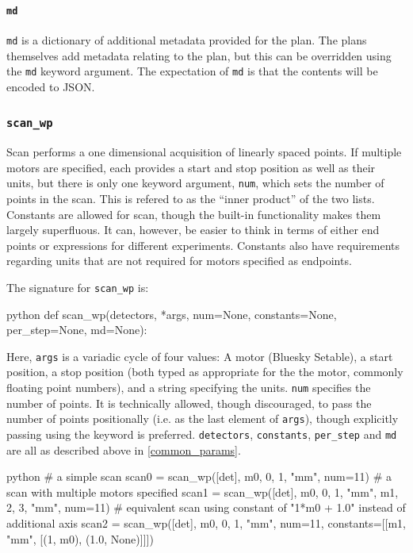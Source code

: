 \paragraph{\texttt{md}}
\texttt{md} is a dictionary of additional metadata provided for the plan.
The plans themselves add metadata relating to the plan, but this can be overridden using the \texttt{md} keyword argument.
The expectation of \texttt{md} is that the contents will be encoded to JSON.

\subsubsection{\texttt{scan\_wp}}

Scan performs a one dimensional acquisition of linearly spaced points.
If multiple motors are specified, each provides a start and stop position as well as their units, but there is only one keyword argument, \texttt{num}, which sets the number of points in the scan.
This is refered to as the ``inner product'' of the two lists.
Constants are allowed for scan, though the built-in functionality makes them largely superfluous.
It can, however, be easier to think in terms of either end points or expressions for different experiments.
Constants also have requirements regarding units that are not required for motors specified as endpoints.

The signature for \texttt{scan\_wp} is:

\begin{codefragment}{python}
def scan_wp(detectors, *args, num=None, constants=None, per_step=None, md=None):
\end{codefragment}

Here, \texttt{args} is a variadic cycle of four values: A motor (Bluesky Setable), a start position, a stop position (both typed as appropriate for the the motor, commonly floating point numbers), and a string specifying the units.
\texttt{num} specifies the number of points.
It is technically allowed, though discouraged, to pass the number of points positionally (i.e. as the last element of \texttt{args}), though explicitly passing using the keyword is preferred.
\texttt{detectors}, \texttt{constants}, \texttt{per\_step} and \texttt{md} are all as described above in \ref{common_params}.

\begin{codefragment}{python}
# a simple scan
scan0 = scan_wp([det], m0, 0, 1, "mm", num=11)
# a scan with multiple motors specified
scan1 = scan_wp([det], m0, 0, 1, "mm", m1, 2, 3, "mm", num=11)
# equivalent scan using constant of "1*m0 + 1.0" instead of additional axis
scan2 = scan_wp([det], m0, 0, 1, "mm", num=11,
                constants=[[m1, "mm", [(1, m0), (1.0, None)]]])
\end{codefragment}

